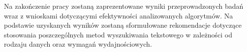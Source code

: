 Na zakończenie pracy zostaną zaprezentowane wyniki przeprowadzonych badań wraz 
z wnioskami dotyczącymi efektywności analizowanych algorytmów. Na podstawie 
uzyskanych wyników zostaną sformułowane rekomendacje dotyczące stosowania 
poszczególnych metod wyszukiwania tekstowego w zależności od rodzaju danych 
oraz wymagań wydajnościowych.


